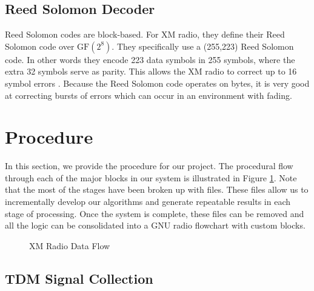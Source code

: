 \documentclass[conference,onecolumn]{IEEEtran}
\begin{document}
\subsection{Reed Solomon Decoder}

Reed Solomon codes are block-based. For XM radio, they define their Reed Solomon code over $\text{GF}\left(2^8\right)$. They specifically use a (255,223) Reed Solomon code. In other words they encode 223 data symbols in 255 symbols, where the extra 32 symbols serve as parity. This allows the XM radio to correct up to 16 symbol errors \cite{a2008_us8260192b2}. Because the Reed Solomon code operates on bytes, it is very good at correcting bursts of errors which can occur in an environment with fading.

\section{Procedure}

In this section, we provide the procedure for our project. The procedural flow through each of the major blocks in our system is illustrated in Figure \ref{fig::xm_radio_processing}. Note that the most of the stages have been broken up with files. These files allow us to incrementally develop our algorithms and generate repeatable results in each stage of processing. Once the system is complete, these files can be removed and all the logic can be consolidated into a GNU radio flowchart with custom blocks.

\begin{figure}[H]
	\centerline{}
	\caption{XM Radio Data Flow}
	\label{fig::xm_radio_processing}
\end{figure}

\subsection{TDM Signal Collection}
\end{document}
